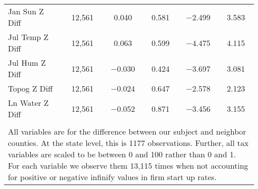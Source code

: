\begin{table}[!htbp]
\begin{tabular}{@{\extracolsep{5pt}}lccccc}
Jan Sun Z Diff & 12,561 & 0.040 & 0.581 & $-$2.499 & 3.583 \\ 
Jul Temp Z Diff & 12,561 & 0.063 & 0.599 & $-$4.475 & 4.115 \\ 
Jul Hum Z Diff & 12,561 & $-$0.030 & 0.424 & $-$3.697 & 3.081 \\ 
Topog Z Diff & 12,561 & $-$0.024 & 0.647 & $-$2.578 & 2.123 \\ 
Ln Water Z Diff & 12,561 & $-$0.052 & 0.871 & $-$3.456 & 3.155 \\ 
\hline \\[-1.8ex] 
\multicolumn{6}{l}{All variables are for the difference between our subject and neighbor counties. At the state level, this is 1177 observations. Further, all tax variables are scaled to be between 0 and 100 rather than 0 and 1. For each variable we observe them 13,115 times when not accounting for positive or negative infinify values in firm start up rates.} \\ 
\end{tabular} 
\end{table} 
